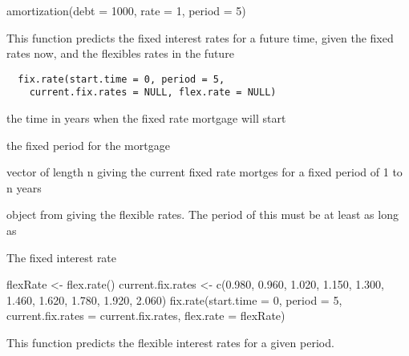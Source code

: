 \documentclass[a4paper]{book}
\begin{document}
%
\begin{Examples}
\begin{ExampleCode}
amortization(debt = 1000, rate = 1, period = 5)
\end{ExampleCode}
\end{Examples}
%
\begin{Description}\relax
This function predicts the fixed interest rates for a
future time, given the fixed rates now, and the flexibles
rates in the future
\end{Description}
%
\begin{Usage}
\begin{verbatim}
  fix.rate(start.time = 0, period = 5,
    current.fix.rates = NULL, flex.rate = NULL)
\end{verbatim}
\end{Usage}
%
\begin{Arguments}
\begin{ldescription}
\item[\code{start.time}] the time in years when the fixed rate
mortgage will start

\item[\code{period}] the fixed period for the mortgage

\item[\code{current.fix.rates}] vector of length n giving the
current fixed rate mortges for a fixed period of 1 to n
years

\item[\code{flex.rate}] object from 
giving the flexible rates. The period of this must be at
least as long as 
\end{ldescription}
\end{Arguments}
%
\begin{Value}
The fixed interest rate
\end{Value}
%
\begin{Examples}
\begin{ExampleCode}
flexRate <- flex.rate()
current.fix.rates <- c(0.980, 0.960, 1.020, 1.150, 1.300, 1.460, 1.620, 1.780, 1.920, 2.060)
fix.rate(start.time = 0, period = 5, current.fix.rates = current.fix.rates, flex.rate = flexRate)
\end{ExampleCode}
\end{Examples}
%
\begin{Description}\relax
This function predicts the flexible interest rates for a
given period.
\end{Description}
\end{document}
